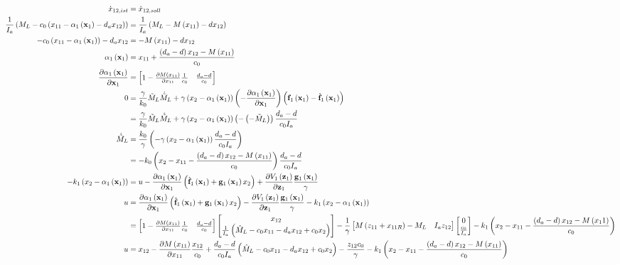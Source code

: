 \documentclass[10pt,a3paper,landscape]{article}
\begin{document}
\begin{align}
	\dot{x}_{12,ist}&=\dot{x}_{12,soll}\\
	\frac{1}{I_a}\mybr{M_L-c_0\mybr{x_{11}-\alphae-d_a x_{12}}}&=\frac{1}{I_a}\mybr{M_L-M\mybr{x_{11}}-d x_{12}}\\
	-c_0\mybr{x_{11}-\alphae}-d_a x_{12}&=-M\mybr{x_{11}}-d x_{12}\\
	\alphae&=x_{11}+\frac{\mybr{d_a-d}x_{12}-M\mybr{x_{11}}}{c_0}\\
	\dadxe&=\begin{bmatrix}1-\frac{\partial M\mybr{x_{11}}}{\partial x_{11}} \frac{1}{c_0} & \frac{d_a-d}{c_0}\end{bmatrix}\\
	0&=\frac{\gamma}{k_0}\mls\mlsp+\gamma\mybr{x_2-\alphae}\mybr{-\dadxe}\mybr{\fe-\fed}\\
	&=\frac{\gamma}{k_0}\mls\mlsp+\gamma\mybr{x_2-\alphae}\mybr{-\mybr{-\mls}}\frac{d_a-d}{c_0I_a}\\
	\mlsp&=\frac{k_0}{\gamma}\mybr{-\gamma\mybr{x_2-\alphae}\frac{d_a-d}{c_0 I_a}}\\
	&=-k_0\mybr{x_2-x_{11}-\frac{\mybr{d_a-d}x_{12}-M\mybr{x_{11}}}{c_0}}\frac{d_a-d}{c_0 I_a}\\
	-k_1\mybr{x_2-\alphae}&=u-\dadxe\mybr{\fed+\ge x_2}+\dVedze \frac{\ge}{\gamma}\\
	u&=\dadxe\mybr{\fed+\ge x_2}-\dVedze \frac{\ge}{\gamma}-k_1\mybr{x_2-\alphae}\\
	&=\begin{bmatrix}1-\frac{\partial M\mybr{x_{11}}}{\partial x_{11}} \frac{1}{c_0} & \frac{d_a-d}{c_0}\end{bmatrix}\begin{bmatrix}x_{12}\\
	\frac{1}{I_a}\mybr{\mld-c_0x_{11}-d_a x_{12}+c_0x_2}
	\end{bmatrix}-\frac{1}{\gamma}\begin{bmatrix}M\mybr{z_{11}+x_{11R}}-M_L & I_a z_{12}\end{bmatrix}\begin{bmatrix}
	0\\\frac{c_0}{I_a}
	\end{bmatrix}-k_1\mybr{x_2-x_{11}-\frac{\mybr{d_a-d}x_{12}-M\mybr{x_11}}{c_0}}\\
	u&=x_{12}-\frac{\partial M\mybr{x_{11}}}{\partial x_{11}}\frac{x_{12}}{c_0}+\frac{d_a-d}{c_0 I_a}\mybr{\mld-c_0 x_{11}-d_a x_{12}+c_0 x_2}-\frac{z_{12} c_0}{\gamma}-k_1\mybr{x_2-x_{11}-\frac{\mybr{d_a-d}x_{12}-M\mybr{x_{11}}}{c_0}}
\end{align}
\end{document}
